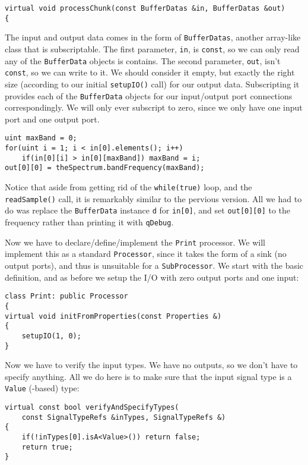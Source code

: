 \begin{verbatim}
virtual void processChunk(const BufferDatas &in, BufferDatas &out)
{
\end{verbatim}

The input and output data comes in the form of \texttt{BufferDatas}, another array-like class that is subscriptable. The first parameter, \texttt{in}, is \texttt{const}, so we can only read any of the \texttt{BufferData} objects is contains. The second parameter, \texttt{out}, isn't \texttt{const}, so we can write to it. We should consider it empty, but exactly the right size (according to our initial \texttt{setupIO()} call) for our output data. Subscripting it provides each of the \texttt{BufferData} objects for our input/output port connections correspondingly. We will only ever subscript to zero, since we only have one input port and one output port.

\begin{verbatim}
uint maxBand = 0;
for(uint i = 1; i < in[0].elements(); i++)
    if(in[0][i] > in[0][maxBand]) maxBand = i;
out[0][0] = theSpectrum.bandFrequency(maxBand);
\end{verbatim}

Notice that aside from getting rid of the \texttt{while(true)} loop, and the \texttt{readSample()} call, it is remarkably similar to the pervious version. All we had to do was replace the \texttt{BufferData} instance \texttt{d} for \texttt{in[0]}, and set \texttt{out[0][0]} to the frequency rather than printing it with \texttt{qDebug}.

Now we have to declare/define/implement the \texttt{Print} processor. We will implement this as a standard \texttt{Processor}, since it takes the form of a sink (no output ports), and thus is unsuitable for a \texttt{SubProcessor}. We start with the basic definition, and as before we setup the I/O with zero output ports and one input:

\begin{verbatim}
class Print: public Processor
{
virtual void initFromProperties(const Properties &)
{
    setupIO(1, 0);
}
\end{verbatim}

Now we have to verify the input types. We have no outputs, so we don't have to specify anything. All we do here is to make sure that the input signal type is a \texttt{Value} (-based) type:

\begin{verbatim}
virtual const bool verifyAndSpecifyTypes(
    const SignalTypeRefs &inTypes, SignalTypeRefs &)
{
    if(!inTypes[0].isA<Value>()) return false;
    return true;
}
\end{verbatim}

